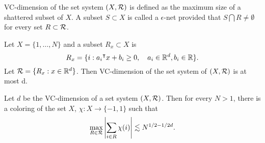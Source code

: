 \begin{definition}[VC-class]
   VC-dimension of the set system $(X, \mathcal{R})$ is defined as the maximum size
   of a shattered subset of $X$. A subset $S \subset X$ is called a
   $\epsilon$-net provided that $S \bigcap R \not= \emptyset$ for every set $R
   \subset \mathcal{R}$.
\end{definition}

\begin{proposition}
   Let $X=\{1, \dots, N\}$ and a subset $R_x \subset X$ is
   \begin{equation}
      R_x = \{i: a_i {}^{\intercal} x + b_i \geq 0, \quad a_i \in \mathbb{R}^d, b_i \in \mathbb{R}\}.
   \end{equation}
   Let $\mathcal{R} = \{R_x: x \in \mathbb{R}^d\}$. Then VC-dimension of the set system of
   $(X, \mathcal{R})$ is at most d.
\end{proposition}

\begin{theorem}
   \cite[Theorem 1.2, p. 595]{matousekDiscrepancyApproximationsBounded1993}
   \label{thm:coloring_set_bound}
   Let $d$ be the VC-dimension of a set system $(X, \mathcal{R})$. Then for every
   $N > 1$, there is a coloring of the set $X$, $\chi: X \to \{-1,1\}$ such that
   \begin{equation}
      \max_{R \in \mathcal{R}} \left| \sum_{i\in R}\chi(i) \right| \lesssim N^{1/2 - 1/2d}.
   \end{equation}
\end{theorem}

